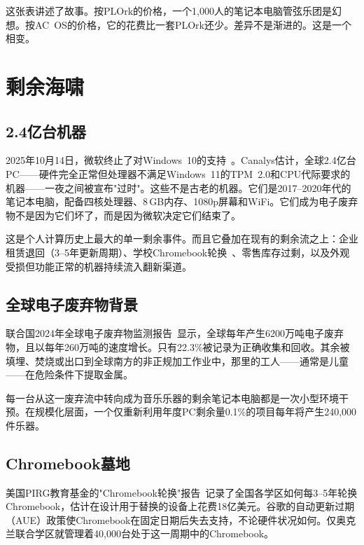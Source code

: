 \documentclass[10pt,letterpaper,twocolumn]{article}
\begin{document}
这张表讲述了故事。按PLOrk的价格，一个1,000人的笔记本电脑管弦乐团是幻想。按AC~OS的价格，它的花费比一套PLOrk还少。差异不是渐进的。这是一个相变。


\section{剩余海啸}
\label{sec:surplus}

\subsection{2.4亿台机器}

2025年10月14日，微软终止了对Windows~10的支持~\citep{canalys2024windows}。Canalys估计，全球2.4亿台PC——硬件完全正常但处理器不满足Windows~11的TPM~2.0和CPU代际要求的机器——一夜之间被宣布"过时"。这些不是古老的机器。它们是2017--2020年代的笔记本电脑，配备四核处理器、8\,GB内存、1080p屏幕和WiFi。它们成为电子废弃物不是因为它们坏了，而是因为微软决定它们结束了。

这是个人计算历史上最大的单一剩余事件。而且它叠加在现有的剩余流之上：企业租赁退回（3--5年更新周期）、学校Chromebook轮换~\citep{pirg2023chromebook}、零售库存过剩，以及外观受损但功能正常的机器持续流入翻新渠道。

\subsection{全球电子废弃物背景}

联合国2024年全球电子废弃物监测报告~\citep{forti2024ewaste}显示，全球每年产生6200万吨电子废弃物，且以每年260万吨的速度增长。只有22.3\%被记录为正确收集和回收。其余被填埋、焚烧或出口到全球南方的非正规加工作业中，那里的工人——通常是儿童——在危险条件下提取金属。

每一台从这一废弃流中转向成为音乐乐器的剩余笔记本电脑都是一次小型环境干预。在规模化层面，一个仅重新利用年度PC剩余量0.1\%的项目每年将产生240,000件乐器。

\subsection{Chromebook墓地}

美国PIRG教育基金的"Chromebook轮换"报告~\citep{pirg2023chromebook}记录了全国各学区如何每3--5年轮换Chromebook，估计在设计用于替换的设备上花费18亿美元。谷歌的自动更新过期（AUE）政策使Chromebook在固定日期后失去支持，不论硬件状况如何。仅奥克兰联合学区就管理着40,000台处于这一周期中的Chromebook。
\end{document}
